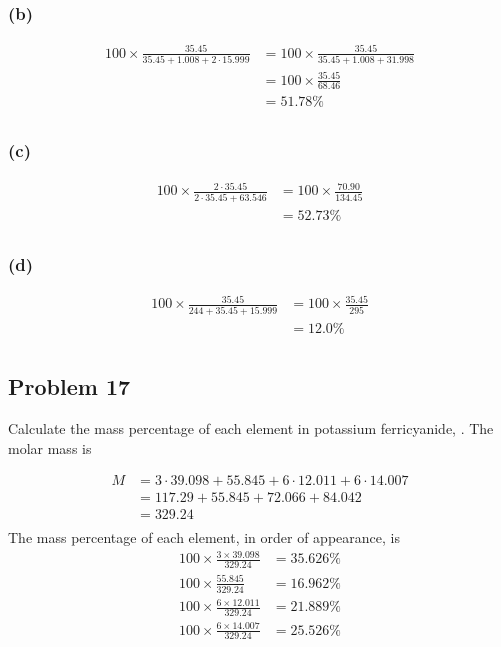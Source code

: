 \documentclass[11pt]{scrartcl}
\begin{document}
\subsubsection{(b)}

\begin{align*}
    100 \times \frac{35.45}{35.45 + 1.008 + 2 \cdot 15.999} &= 100 \times \frac{35.45}{35.45 + 1.008 + 31.998} \\
    &= 100 \times \frac{35.45}{68.46} \\
    &= \boxed{51.78\%} \\
\end{align*}

\subsubsection{(c)}

\begin{align*}
    100 \times \frac{2 \cdot 35.45}{2 \cdot 35.45 + 63.546} &= 100 \times \frac{70.90}{134.45} \\
    &= \boxed{52.73\%} \\
\end{align*}

\subsubsection{(d)}


\begin{align*}
    100 \times \frac{35.45}{244 + 35.45 + 15.999} &= 100 \times \frac{35.45}{295} \\
    &= \boxed{12.0\%} \\
\end{align*}

\newpage
\subsection{Problem 17}
Calculate the mass percentage of each element in potassium ferricyanide, .
The molar mass is

\begin{align*}
    M &= 3 \cdot 39.098 + 55.845 + 6 \cdot 12.011 + 6 \cdot 14.007 \\
    &= 117.29 + 55.845 + 72.066 + 84.042 \\
    &= 329.24 \\
\end{align*}
The mass percentage of each element, in order of appearance, is
\begin{align*}
    100 \times \frac{3 \times 39.098}{329.24} &= \boxed{35.626\%} \\
    100 \times \frac{55.845}{329.24} &= \boxed{16.962\%} \\
    100 \times \frac{6 \times 12.011}{329.24} &= \boxed{21.889\%} \\
    100 \times \frac{6 \times 14.007}{329.24} &= \boxed{25.526\%} \\
\end{align*}
\end{document}
